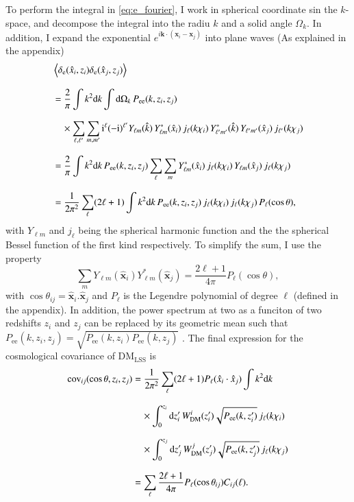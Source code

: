 To perform the integral in \ref{eq:e_fourier}, I work in spherical coordinate sin the $k$-space, and decompose the integral into the radiu $k$ and a solid angle $\Omega_k$. In addition, I expand the exponential $e^{i\mathbf{k} \cdot (\mathbf{x}_i - \mathbf{x}_j)}$ into plane waves (As explained in the appendix)
\begin{align}
&\left\langle \delta_{\mathrm{e}}(\hat{x}_i, z_i) \delta_{\mathrm{e}}(\hat{x}_j, z_j) \right\rangle \notag \\[8pt]
&= \frac{2}{\pi} \int k^2 \mathrm{d}k \int \mathrm{d}\Omega_k \, P_{\mathrm{ee}}(k, z_i, z_j) \notag \\[8pt]
&\quad \times \sum_{\ell, \ell'} \sum_{m, m'} \mathrm{i}^\ell (-\mathrm{i})^{\ell'} Y_{\ell m}(\hat{k}) \, Y^*_{\ell m}(\hat{x}_i) \, j_\ell(k\chi_i) \, Y^*_{\ell' m'}(\hat{k}) \, Y_{\ell' m'}(\hat{x}_j) \, j_{\ell'}(k\chi_j) \notag \\[8pt]
&= \frac{2}{\pi} \int k^2 \mathrm{d}k \, P_{\mathrm{ee}}(k, z_i, z_j) \sum_{\ell} \sum_{m} Y^*_{\ell m}(\hat{x}_i) \, j_\ell(k\chi_i) \, Y_{\ell m}(\hat{x}_j) \, j_\ell(k\chi_j) \notag \\[8pt]
&= \frac{1}{2\pi^2} \sum_{\ell} (2\ell+1) \int k^2 \mathrm{d}k \, P_{\mathrm{ee}}(k, z_i, z_j) \, j_\ell(k\chi_i) \, j_\ell(k\chi_j) \, P_\ell(\cos\theta),
\end{align}
with $Y_{\ell m}$ and $j_\ell$ being the spherical harmonic function and the the spherical Bessel function of the first kind respectively. To simplify the sum, I use the property 
\begin{equation} \label{eq:spherical_property}
    \sum_m Y_{\ell m}(\mathbf{\hat{x}}_i) Y^*_{\ell m}(\mathbf{\hat{x}}_j) = \frac{2\ell+1}{4\pi} P_\ell(\cos\theta),
\end{equation}
with $\cos\theta_{ij} =\mathbf{\hat{x}}_i . \mathbf{\hat{x}}_j $ and $P_\ell$ is the Legendre polynomial of degree $\ell$ (defined in the appendix). In addition, the power spectrum at two as a funciton of two redshifts $z_i$ and $z_j$ can be replaced by its geometric mean such that $P_{\mathrm{ee}}(k, z_i, z_j) = \sqrt{P_{\mathrm{ee}}(k, z_i) P_{\mathrm{ee}}(k, z_j)}$ \citep{PhysRevD.95.063522}. The final expression for the cosmological covariance of $\mathrm{DM}_\mathrm{LSS}$ is
\begin{align}\label{eq:cosmological_covariance}
\mathrm{cov}_{ij}(\cos\theta, z_i, z_j) &= \frac{1}{2\pi^2} \sum_{\ell} (2\ell+1) P_\ell(\hat{x}_i \cdot \hat{x}_j) \int k^2 \mathrm{d}k \notag \\[8pt]
&\quad \times \int_0^{z_i} \mathrm{d}z_i' \, W_{\mathrm{DM}}^i(z_i') \sqrt{P_{\mathrm{ee}}(k, z_i')} \, j_\ell(k\chi_i) \notag \\[8pt]
&\quad \times \int_0^{z_j} \mathrm{d}z_j' \, W_{\mathrm{DM}}^j(z_j') \sqrt{P_{\mathrm{ee}}(k, z_j')} \, j_\ell(k\chi_j) \notag \\[8pt]
&= \sum_{\ell} \frac{2\ell+1}{4\pi} P_\ell(\cos\theta_{ij}) C_{ij}(\ell).
\end{align}


